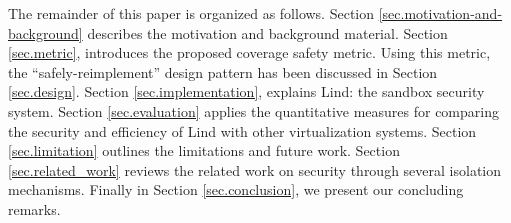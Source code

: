 The remainder of this paper is organized as follows.
Section \ref{sec.motivation-and-background} describes the motivation and background material.
Section \ref{sec.metric}, introduces the proposed coverage safety metric. Using this metric, the
``safely-reimplement'' design pattern has been discussed in Section \ref{sec.design}. Section \ref{sec.implementation},
explains Lind: the sandbox security system. Section \ref{sec.evaluation} applies the quantitative measures for comparing
the security and efficiency of Lind with other virtualization systems. Section \ref{sec.limitation} outlines the limitations and future work.
Section \ref{sec.related_work} reviews the related work on security through several isolation mechanisms.
Finally in Section \ref{sec.conclusion}, we present our concluding remarks.
